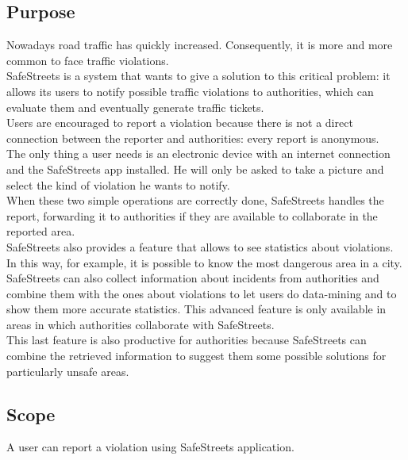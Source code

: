 \documentclass{article}
\begin{document}
		\subsection{Purpose}
		Nowadays road traffic has quickly increased. Consequently, it is more and more common to face traffic violations.\\
		SafeStreets is a system that wants to give a solution to this critical problem: it allows its users to notify possible traffic violations to authorities, which can evaluate them and eventually generate traffic tickets.\\
		Users are encouraged to report a violation because there is not a direct connection between the reporter and authorities: every report is anonymous.\\
		The only thing a user needs is an electronic device with an internet connection and the SafeStreets app installed. He will only be asked to take a picture and select the kind of violation he wants to notify.\\
		When these two simple operations are correctly done, SafeStreets handles the report, forwarding it to authorities if they are available to collaborate in the reported area.\\
		SafeStreets also provides a feature that allows to see statistics about violations. In this way, for example, it is possible to know the most dangerous area in a city.\\
		SafeStreets can also collect information about incidents from authorities and combine them with the ones about violations to let users do data-mining and to show them more accurate statistics. This advanced feature is only available in areas in which authorities collaborate with SafeStreets.\\
		This last feature is also productive for authorities because SafeStreets can combine the retrieved information to suggest them some possible solutions for particularly unsafe areas.\\
	
		\subsection{Scope}
			A user can report a violation using SafeStreets application.
\end{document}
